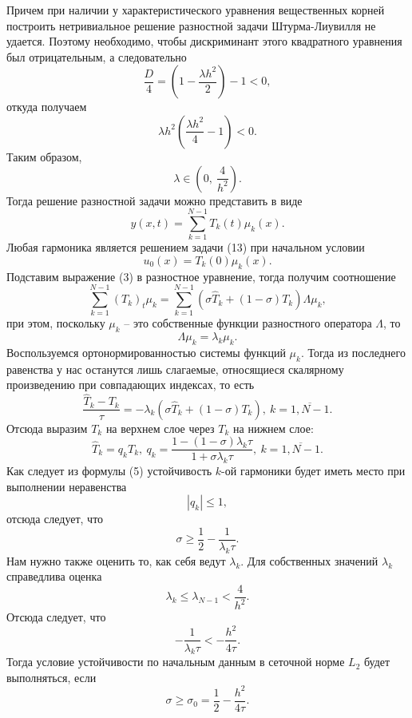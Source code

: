 \documentclass[a4paper, 12pt]{article}
\begin{document}
    	Причем при наличии у характеристического уравнения вещественных корней построить нетривиальное решение разностной задачи Штурма-Лиувилля не удается. Поэтому необходимо, чтобы дискриминант этого квадратного уравнения был отрицательным, а следовательно
    	$$\dfrac D 4 = \left(1 - \dfrac{\lambda h^2}{2}\right) - 1 < 0,$$
    	откуда получаем
    	$$\lambda h^2 \left( \dfrac{\lambda h^2}{4} - 1\right) < 0.$$
    	Таким образом, $$\lambda \in \left(0,\ \dfrac{4}{h^2}\right).$$
    	Тогда решение разностной задачи можно представить в виде
    	\begin{equation}
    		y(x,t) = \sum_{k=1}^{N-1}T_k(t)\mu_k(x).
    	\end{equation}
    	Любая гармоника является решением задачи (13) при начальном условии $$u_0(x)= T_k(0)\mu_k(x).$$
    	Подставим выражение (3) в разностное уравнение, тогда получим соотношение
    	\begin{equation*}
    		\sum_{k=1}^{N-1} (T_k)_t \mu_k = \sum_{k=1}^{N-1} (\sigma \hat T_k + (1-\sigma)T_k)\Lambda \mu_k,
    	\end{equation*}
    	при этом, поскольку $\mu_k$ -- это собственные функции разностного оператора $\Lambda$, то
    	$$\Lambda \mu_k = \lambda_k \mu _k.$$
    	Воспользуемся ортонормированностью системы функций $\mu_k$. Тогда из последнего равенства у нас останутся лишь слагаемые, относящиеся скалярному произведению при совпадающих индексах, то есть
    	$$\dfrac{\hat T_k - T_k}{\tau} = -\lambda_k (\sigma \hat T_k + (1-\sigma)T_k),\ k=\overline{1, N-1}.$$
    	Отсюда выразим $T_k$ на верхнем слое через $T_k$ на нижнем слое:
    	\begin{equation}
    		\hat T_k = q_k T_k,\ q_k = \dfrac{1 - (1-\sigma)\lambda_k \tau}{1+\sigma \lambda_k \tau},\ k = \overline {1, N-1}.
    	\end{equation}
    	Как следует из формулы (5) устойчивость $k$-ой гармоники будет иметь место при выполнении неравенства
    	$$|q_k|\leq 1,$$
    	отсюда следует, что 
    	$$\sigma \geq \dfrac 12 - \dfrac{1}{\lambda_k \tau}.$$
    	Нам нужно также оценить то, как себя ведут $\lambda_k$. Для собственных значений $\lambda_k$ справедлива оценка
    	$$\lambda_k \leq \lambda _{N-1} < \dfrac{4}{h^2}.$$
    	Отсюда следует, что 
    	$$-\dfrac{1}{\lambda_k\tau} < -\dfrac{h^2}{4\tau}.$$
    	Тогда условие устойчивости по начальным данным в сеточной норме $L_2$ будет выполняться, если 
    	\begin{equation}
    		\sigma \geq \sigma_0 = \dfrac 12 - \dfrac {h^2}{4\tau}.
    	\end{equation}
\end{document}
